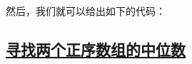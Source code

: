 \documentclass[../../main.tex]{subfiles}
\begin{document}
然后，我们就可以给出如下的代码：



\subsection{\href{https://leetcode.cn/problems/median-of-two-sorted-arrays/}{寻找两个正序数组的中位数}}
\end{document}

